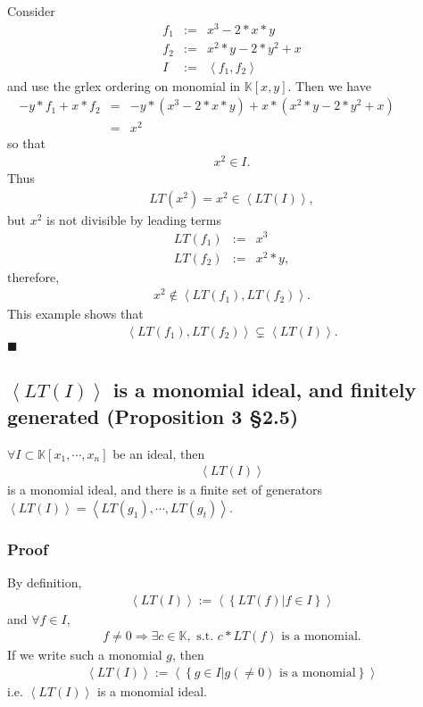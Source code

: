 \documentclass[11pt]{book}
\begin{document}
Consider
\begin{eqnarray}
f_1 &:=& x^3-2*x*y \\
f_2 &:=& x^2*y -2*y^2 + x \\
I &:=& \left< f_1, f_2 \right>
\end{eqnarray}
and use the grlex ordering on monomial in $\mathbb{K}[x,y]$.
Then we have
\begin{eqnarray}
-y * f_1+x * f_2 &=& -y * (x^3-2*x*y) + x * (x^2*y -2*y^2 + x) \qquad\qquad\\
&=& x^2
\end{eqnarray}
so that
\begin{eqnarray}
x^2 \in I.
\end{eqnarray}
Thus
\begin{eqnarray}
LT(x^2) = x^2 \in \left< LT(I)  \right>,
\end{eqnarray}
but $x^2$ is not divisible by leading terms
\begin{eqnarray}
LT(f_1) &:=& x^3 \\
LT(f_2) &:=& x^2 * y,
\end{eqnarray}
therefore,
\begin{eqnarray}
x^2 \notin \left< LT(f_1), LT(f_2)  \right>.
\end{eqnarray}
This example shows that
\begin{eqnarray}
\left< LT(f_1), LT(f_2)  \right> \subsetneq  \left< LT(I) \right>.
\end{eqnarray}
$\blacksquare$

\subsection{$\left< LT(I) \right>$ is a monomial ideal, and finitely generated (Proposition 3 \S2.5)}
\label{monomialIdeals}
$\forall I \subset \mathbb{K}[x_1, \cdots, x_{n}]$ be an ideal, then
\begin{eqnarray}
\left< LT(I) \right>
\end{eqnarray}
is a monomial ideal, and there is a finite set of generators $\left< LT(I) \right> = \left< LT(g_1), \cdots, LT(g_t) \right>$.

\subsubsection{Proof}
By definition,
\begin{eqnarray}
\left< LT(I) \right>  := \left< \left\{ \left. LT(f) \right| f \in I \right\} \right>
\end{eqnarray}
and $\forall f \in I$,
\begin{eqnarray}
f \neq 0 \Rightarrow \exists c \in \mathbb{K}, \text{ s.t. } c* LT(f) \text{ is a monomial}.
\end{eqnarray}
If we write such a monomial $g$, then
\begin{eqnarray}
\left< LT(I) \right>  := \left< \left\{ \left. g \in I \right| g (\neq 0) \text{ is a monomial} \right\} \right>
\end{eqnarray}
i.e. $\left< LT(I) \right> $ is a monomial ideal.
\end{document}
